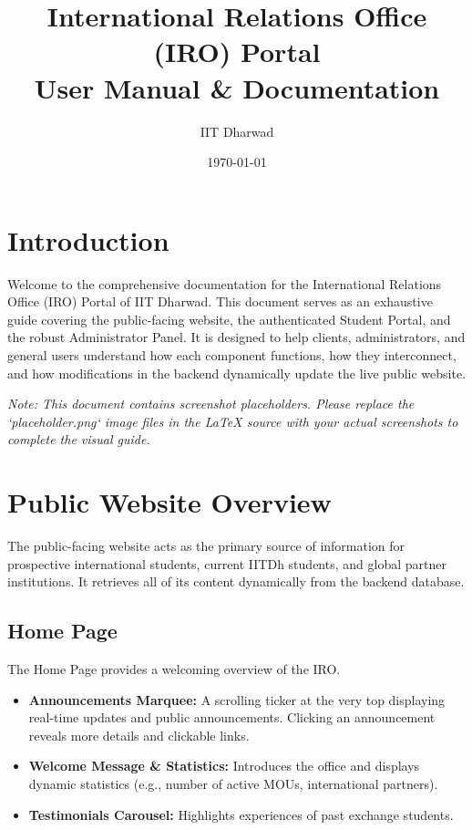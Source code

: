 \documentclass[12pt, a4paper]{article}
\title{\textbf{International Relations Office (IRO) Portal\\ User Manual \& Documentation}}
\author{IIT Dharwad}
\date{\today}
\begin{document}
\maketitle
\tableofcontents
\newpage

\section{Introduction}
Welcome to the comprehensive documentation for the International Relations Office (IRO) Portal of IIT Dharwad. This document serves as an exhaustive guide covering the public-facing website, the authenticated Student Portal, and the robust Administrator Panel. It is designed to help clients, administrators, and general users understand how each component functions, how they interconnect, and how modifications in the backend dynamically update the live public website.

\textit{Note: This document contains screenshot placeholders. Please replace the `placeholder.png` image files in the LaTeX source with your actual screenshots to complete the visual guide.}

\section{Public Website Overview}
The public-facing website acts as the primary source of information for prospective international students, current IITDh students, and global partner institutions. It retrieves all of its content dynamically from the backend database.

\subsection{Home Page}
The Home Page provides a welcoming overview of the IRO. 
\begin{itemize}
    \item \textbf{Announcements Marquee:} A scrolling ticker at the very top displaying real-time updates and public announcements. Clicking an announcement reveals more details and clickable links.
    \item \textbf{Welcome Message \& Statistics:} Introduces the office and displays dynamic statistics (e.g., number of active MOUs, international partners).
    \item \textbf{Testimonials Carousel:} Highlights experiences of past exchange students.
\end{itemize}
\end{document}
